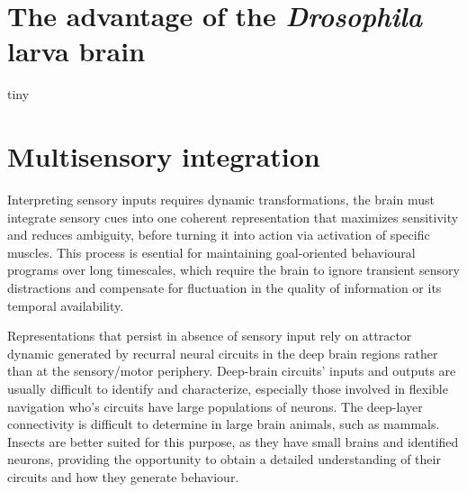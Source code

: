 


\section{The advantage of the \textit{Drosophila} larva brain}
    tiny
\label{}



\section{Multisensory integration} 

    Interpreting sensory inputs requires dynamic transformations, the brain must integrate sensory cues into one coherent representation that maximizes sensitivity and reduces ambiguity, before turning it into action via
    activation of specific muscles. This process is esential for maintaining goal-oriented behavioural programs over long timescales, which require the brain to ignore transient sensory distractions and compensate for fluctuation in the quality of information or its temporal availability.

    Representations that persist in absence of sensory input rely on attractor dynamic generated by recurral neural circuits in the deep brain regions rather than at the sensory/motor periphery. Deep-brain circuits' inputs and outputs are usually difficult to identify and characterize, especially those involved in flexible navigation who's circuits have large populations of neurons.
    The deep-layer connectivity is difficult to determine in large brain animals, such as mammals. Insects are better suited for this purpose, as they have small brains and identified neurons, providing the opportunity to obtain a detailed understanding of their circuits and how they generate behaviour. 


